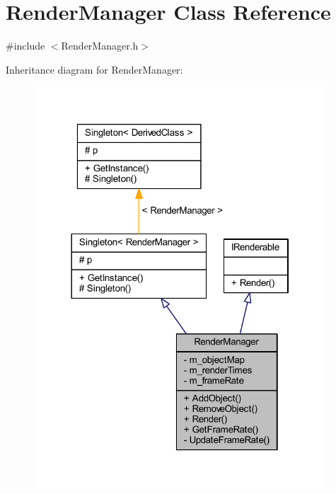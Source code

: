 \hypertarget{class_render_manager}{}\section{Render\+Manager Class Reference}
\label{class_render_manager}


{\ttfamily \#include $<$Render\+Manager.\+h$>$}



Inheritance diagram for Render\+Manager\+:\nopagebreak
\begin{figure}[H]
\begin{center}
\leavevmode
\includegraphics[width=310pt]{class_render_manager__inherit__graph}
\end{center}
\end{figure}


